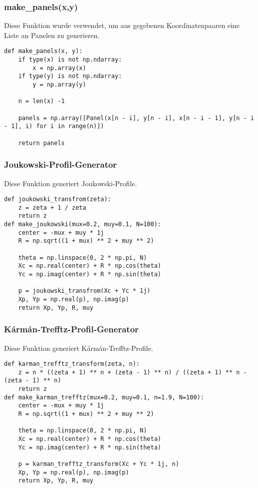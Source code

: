 \subsubsection{make\_panels(x,y)}
Diese Funktion wurde verwendet, um aus gegebenen Koordinatenpaaren eine Liste an Panelen zu generieren. 
\begin{lstlisting}
def make_panels(x, y):
    if type(x) is not np.ndarray:
        x = np.array(x)
    if type(y) is not np.ndarray:
        y = np.array(y)
        
    n = len(x) -1

    panels = np.array([Panel(x[n - i], y[n - i], x[n - i - 1], y[n - i - 1], i) for i in range(n)])
    
    return panels
\end{lstlisting}

\subsubsection{Joukowski-Profil-Generator}
Diese Funktion generiert Joukowski-Profile.
\begin{lstlisting}
def joukowski_transfrom(zeta):
    z = zeta + 1 / zeta
    return z
def make_joukowski(mux=0.2, muy=0.1, N=100):
    center = -mux + muy * 1j 
    R = np.sqrt((1 + mux) ** 2 + muy ** 2)

    theta = np.linspace(0, 2 * np.pi, N)
    Xc = np.real(center) + R * np.cos(theta)
    Yc = np.imag(center) + R * np.sin(theta)

    p = joukowski_transfrom(Xc + Yc * 1j)
    Xp, Yp = np.real(p), np.imag(p)
    return Xp, Yp, R, muy
\end{lstlisting}

\subsubsection{Kármán-Trefftz-Profil-Generator}
Diese Funktion generiert Kármán-Trefftz-Profile.
\begin{lstlisting}
def karman_trefftz_transform(zeta, n):
    z = n * ((zeta + 1) ** n + (zeta - 1) ** n) / ((zeta + 1) ** n - (zeta - 1) ** n)
    return z
def make_karman_trefftz(mux=0.2, muy=0.1, n=1.9, N=100):
    center = -mux + muy * 1j
    R = np.sqrt((1 + mux) ** 2 + muy ** 2) 

    theta = np.linspace(0, 2 * np.pi, N)
    Xc = np.real(center) + R * np.cos(theta)
    Yc = np.imag(center) + R * np.sin(theta)

    p = karman_trefftz_transform(Xc + Yc * 1j, n)
    Xp, Yp = np.real(p), np.imag(p)
    return Xp, Yp, R, muy
\end{lstlisting}


